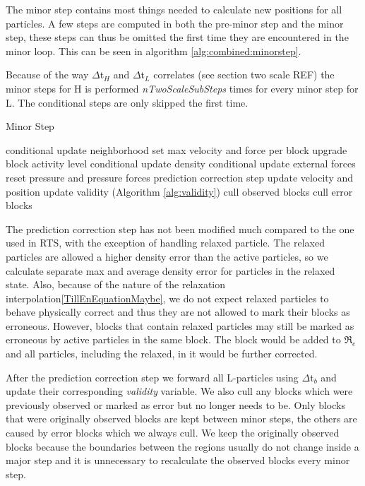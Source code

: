 \documentclass[../../main.tex]{subfiles}
\begin{document}

The minor step contains most things needed to calculate new positions for all particles. A few steps are computed in both the pre-minor step and the minor step, these steps can thus be omitted the first time they are encountered in the minor loop. This can be seen in algorithm \ref{alg:combined:minorstep}. 

Because of the way $\Delta$t$_H$ and $\Delta$t$_L$ correlates (see section two scale REF) the minor steps for H is performed \textit{nTwoScaleSubSteps} times for every minor step for L. The conditional steps are only skipped the first time. 

\begin{algorithm}[h]
    \caption{Minor Step}
    \label{alg:combined:minorstep}
    \begin{algorithmic}[1]
        \State conditional update neighborhood 
        \State set max velocity and force per block
        \State upgrade block activity level
        \State conditional update density 
        \State conditional update external forces
    \EndIf
    \State reset pressure and pressure forces
    \State prediction correction step
    \State update velocity and position
    \State update validity (Algorithm \ref{alg:validity})
    \State cull observed blocks
	\State cull error blocks
   \end{algorithmic}
\end{algorithm}

The prediction correction step has not been modified much compared to the one used in RTS, with the exception of handling relaxed particle. The relaxed particles are allowed a higher density error than the active particles, so we calculate separate max and average density error for particles in the relaxed state. Also, because of the nature of the relaxation interpolation\ref{TillEnEquationMaybe}, we do not expect relaxed particles to behave physically correct and thus they are not allowed to mark their blocks as erroneous. However, blocks that contain relaxed particles may still be marked as erroneous by active particles in the same block. The block would be added to $\Re_e$ and all particles, including the relaxed, in it would be further corrected.

After the prediction correction step we forward all L-particles using $\Delta$t$_b$ and update their corresponding \textit{validity} variable. We also cull any blocks which were previously observed or marked as error but no longer needs to be. Only blocks that were originally observed blocks are kept between minor steps, the others are caused by error blocks which we always cull. We keep the originally observed blocks because the boundaries between the regions usually do not change inside a major step and it is unnecessary to recalculate the observed blocks every minor step. 
\end{document}
